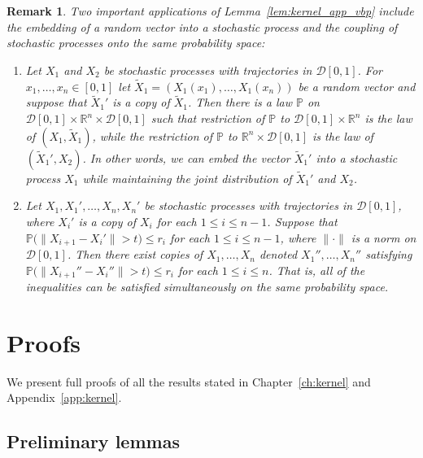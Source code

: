 \documentclass[11pt,lof]{puthesis}
\renewcommand{\P}{\ensuremath{\mathbb{P}}}
\newcommand{\R}{\ensuremath{\mathbb{R}}}
\newcommand{\cD}{\ensuremath{\mathcal{D}}}
\theoremstyle{break}
\newtheorem{remark}{Remark}[section]
\theoremstyle{proof}
\begin{document}
\begin{remark}

  Two important applications of
  Lemma~\ref{lem:kernel_app_vbp} include
  the embedding of a random vector into a stochastic process
  and the coupling of stochastic processes
  onto the same probability space:
  \begin{enumerate}[label=(\roman*)]

    \item
      Let $X_1$ and $X_2$
      be stochastic processes with
      trajectories in $\cD[0,1]$.
      For $x_1, \ldots, x_n \in [0,1]$
      let $\tilde X_1 = (X_1(x_1), \ldots, X_1(x_n))$
      be a random vector
      and suppose that $\tilde X_1'$
      is a copy of $\tilde X_1$.
      Then there is a law $\P$ on
      $\cD[0,1] \times \R^n \times \cD[0,1]$
      such that restriction of $\P$ to
      $\cD[0,1] \times \R^n$
      is the law of $(X_1, \tilde X_1)$,
      while the restriction of $\P$ to
      $\R^n \times \cD[0,1]$
      is the law of $(\tilde X_1',X_2)$.
      In other words,
      we can embed the vector $\tilde X_1'$
      into a stochastic process $X_1$
      while maintaining the joint distribution of
      $\tilde X_1'$ and $X_2$.

    \item
      Let $X_1, X_1', \ldots, X_n, X_n'$
      be stochastic processes with
      trajectories in $\cD[0,1]$,
      where $X_i'$ is a copy of $X_i$
      for each $1 \leq i \leq n-1$.
      Suppose that
      $\P\big(\|X_{i+1} - X_i'\| > t)\leq r_i$
      for each $1 \leq i \leq n-1$,
      where $\|\cdot\|$ is a norm on $\cD[0,1]$.
      Then there exist copies of
      $X_1, \ldots, X_n$
      denoted $X_1'', \ldots, X_n''$ satisfying $\P\big(\|X_{i+1}'' - X_i''\| >
      t)\leq r_i$ for each $1 \leq i \leq n$.
      That is, all of the inequalities
      can be satisfied simultaneously
      on the same probability space.

  \end{enumerate}

\end{remark}

\section{Proofs}
\label{sec:kernel_app_proofs}

We present full proofs of all the results stated in
Chapter~\ref{ch:kernel} and Appendix~\ref{app:kernel}.

\subsection{Preliminary lemmas}
\end{document}
